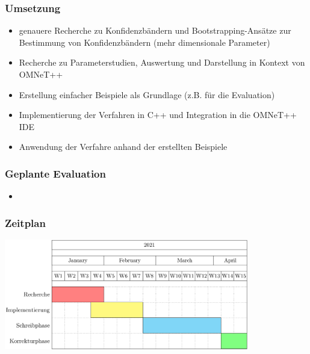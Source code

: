 \documentclass[aspectratio=1610, 9pt]{beamer}
\begin{document}
\begin{frame}
  \frametitle{Umsetzung}
  \begin{itemize}
    \item genauere Recherche zu Konfidenzbändern und Bootstrapping-Ansätze zur Bestimmung von Konfidenzbändern (mehr dimensionale Parameter)
    \item Recherche zu Parameterstudien, Auswertung und Darstellung in Kontext von OMNeT++
    \item Erstellung einfacher Beispiele als Grundlage (z.B. für die Evaluation)
    \item Implementierung der Verfahren in C++ und Integration in die OMNeT++ IDE
    \item Anwendung der Verfahre anhand der erstellten Beispiele
  \end{itemize}
\end{frame}

\begin{frame}
  \frametitle{Geplante Evaluation}
  \begin{itemize}
    \item 
  \end{itemize}
\end{frame}

\begin{frame}
  \frametitle{Zeitplan}
  \begin{center}
    \includegraphics[width=0.8\textwidth]{images/2.png}
  \end{center}
\end{frame}

\end{document}
